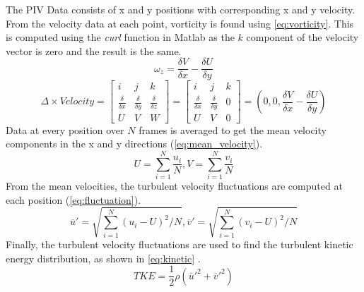 The PIV Data consists of x and y positions with corresponding x and y velocity. From the velocity data at each point, vorticity is found using \autoref{eq:vorticity}. This is computed using the \textit{curl} function in Matlab as the $k$ component of the velocity vector is zero and the result is the same.
\begin{equation}\label{eq:vorticity}
    \omega _z = \frac{\delta V}{\delta x} - \frac{\delta U}{\delta y}
\end{equation}
\begin{equation}\label{eq:curl}
    \Delta \times Velocity = \begin{bmatrix} i & j & k \\ \frac{\delta}{\delta x} & \frac{\delta}{\delta y} & \frac{\delta}{\delta z} \\ U & V & W \end{bmatrix} = \begin{bmatrix} i & j & k \\ \frac{\delta}{\delta x} & \frac{\delta}{\delta y} & 0 \\ U & V & 0 \end{bmatrix} = (0,0,\frac{\delta V}{\delta x} - \frac{\delta U}{\delta y})
\end{equation}
Data at every position over $N$ frames is averaged to get the mean velocity components in the x and y directions (\autoref{eq:mean_velocity}). 
\begin{equation}\label{eq:mean_velocity}
    U = \sum^N_{i=1} \frac{u_i}{N}, V = \sum^N_{i=1} \frac{v_i}{N} 
\end{equation}
From the mean velocities, the turbulent velocity fluctuations are computed at each position (\autoref{eq:fluctuation}).
\begin{equation}\label{eq:fluctuation}
    \overline{u}' = \sqrt{\sum^N_{i=1}(u_i-U)^2/N},
    \overline{v}' = \sqrt{\sum^N_{i=1}(v_i-U)^2/N}
\end{equation}
Finally, the turbulent velocity fluctuations are used to find the turbulent kinetic energy distribution, as shown in \autoref{eq:kinetic} \citep{lab11-manual}.
\begin{equation}\label{eq:kinetic}
    TKE = \frac{1}{2}\rho(\overline{u}'^2 + \overline{v}'^2)
\end{equation}

